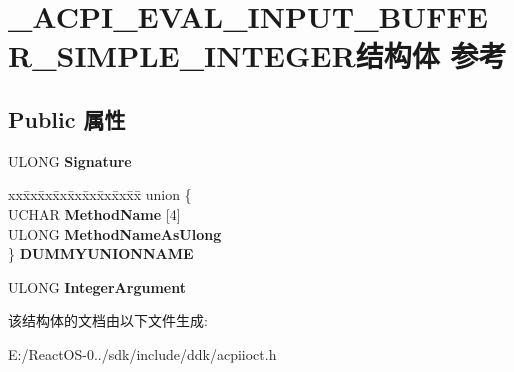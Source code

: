 \hypertarget{struct___a_c_p_i___e_v_a_l___i_n_p_u_t___b_u_f_f_e_r___s_i_m_p_l_e___i_n_t_e_g_e_r}{}\section{\+\_\+\+A\+C\+P\+I\+\_\+\+E\+V\+A\+L\+\_\+\+I\+N\+P\+U\+T\+\_\+\+B\+U\+F\+F\+E\+R\+\_\+\+S\+I\+M\+P\+L\+E\+\_\+\+I\+N\+T\+E\+G\+E\+R结构体 参考}
\label{struct___a_c_p_i___e_v_a_l___i_n_p_u_t___b_u_f_f_e_r___s_i_m_p_l_e___i_n_t_e_g_e_r}
\subsection*{Public 属性}
\begin{DoxyCompactItemize}
\item 
\mbox{\label{struct___a_c_p_i___e_v_a_l___i_n_p_u_t___b_u_f_f_e_r___s_i_m_p_l_e___i_n_t_e_g_e_r_ae1cd467988469fc501760d8c7c569df4}} 
U\+L\+O\+NG {\bfseries Signature}
\item 
\mbox{\label{struct___a_c_p_i___e_v_a_l___i_n_p_u_t___b_u_f_f_e_r___s_i_m_p_l_e___i_n_t_e_g_e_r_a23d586337cd1f5bf6f9f8a4c99d2c229}} 
\begin{tabbing}
xx\=xx\=xx\=xx\=xx\=xx\=xx\=xx\=xx\=\kill
union \{\\
\>UCHAR {\bfseries MethodName} \mbox{[}4\mbox{]}\\
\>ULONG {\bfseries MethodNameAsUlong}\\
\} {\bfseries DUMMYUNIONNAME}\\

\end{tabbing}\item 
\mbox{\label{struct___a_c_p_i___e_v_a_l___i_n_p_u_t___b_u_f_f_e_r___s_i_m_p_l_e___i_n_t_e_g_e_r_a898bf6e6c6e4ba78e912ff691b0415b1}} 
U\+L\+O\+NG {\bfseries Integer\+Argument}
\end{DoxyCompactItemize}


该结构体的文档由以下文件生成\+:\begin{DoxyCompactItemize}
\item 
E\+:/\+React\+O\+S-\/0../sdk/include/ddk/acpiioct.\+h\end{DoxyCompactItemize}
